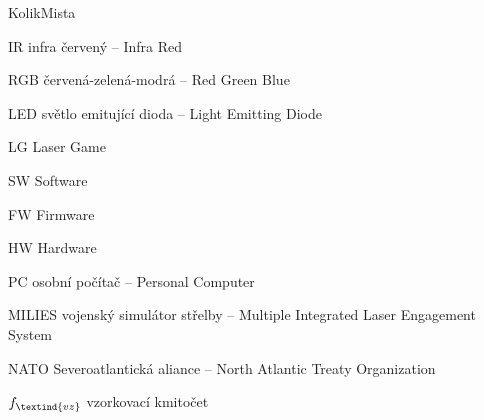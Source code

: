 \begin{seznamzkratek}{KolikMista}

    {IR}
    {infra červený -- Infra Red}

    {RGB}
    {červená-zelená-modrá -- Red Green Blue}

    {LED}
    {světlo emitující dioda -- Light Emitting Diode}

    {LG}
    {Laser Game}

    {SW}
    {Software}

    {FW}
    {Firmware}

    {HW}
    {Hardware}

    {PC}
    {osobní počítač -- Personal Computer}

    {MILIES}
    {vojenský simulátor střelby -- Multiple Integrated Laser Engagement System}

    {NATO}
    {Severoatlantická aliance -- North Atlantic Treaty Organization}


  {\ensuremath{f_\textind{vz}}}
  {vzorkovací kmitočet}

\end{seznamzkratek}
